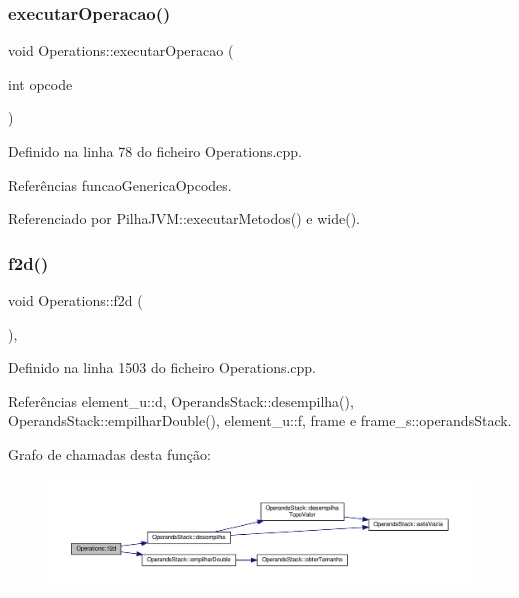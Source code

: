 \subsubsection{\texorpdfstring{executar\+Operacao()}{executarOperacao()}}
{\footnotesize\ttfamily void Operations\+::executar\+Operacao (\begin{DoxyParamCaption}\item[{int}]{opcode }\end{DoxyParamCaption})\hspace{0.3cm}{\ttfamily [static]}}



Definido na linha 78 do ficheiro Operations.\+cpp.



Referências funcao\+Generica\+Opcodes.



Referenciado por Pilha\+J\+V\+M\+::executar\+Metodos() e wide().

\mbox{\label{classOperations_afb29ca09bc75d3342920b1509aba3635}} 
\subsubsection{\texorpdfstring{f2d()}{f2d()}}
{\footnotesize\ttfamily void Operations\+::f2d (\begin{DoxyParamCaption}{ }\end{DoxyParamCaption})\hspace{0.3cm}{\ttfamily [static]}, {\ttfamily [private]}}



Definido na linha 1503 do ficheiro Operations.\+cpp.



Referências element\+\_\+u\+::d, Operands\+Stack\+::desempilha(), Operands\+Stack\+::empilhar\+Double(), element\+\_\+u\+::f, frame e frame\+\_\+s\+::operands\+Stack.

Grafo de chamadas desta função\+:\nopagebreak
\begin{figure}[H]
\begin{center}
\leavevmode
\includegraphics[width=350pt]{classOperations_afb29ca09bc75d3342920b1509aba3635_cgraph}
\end{center}
\end{figure}
\mbox{\label{classOperations_adea8a32fb2ba183d0200ac22e1126fde}} 
